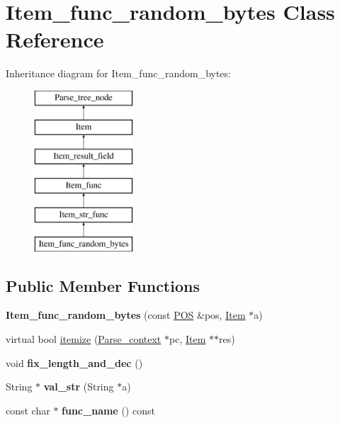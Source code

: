 \hypertarget{classItem__func__random__bytes}{}\section{Item\+\_\+func\+\_\+random\+\_\+bytes Class Reference}
\label{classItem__func__random__bytes}
Inheritance diagram for Item\+\_\+func\+\_\+random\+\_\+bytes\+:\begin{figure}[H]
\begin{center}
\leavevmode
\includegraphics[height=6.000000cm]{classItem__func__random__bytes}
\end{center}
\end{figure}
\subsection*{Public Member Functions}
\begin{DoxyCompactItemize}
\item 
\mbox{\label{classItem__func__random__bytes_adfdfefe08f2b175c391f0cabd0fcadf1}} 
{\bfseries Item\+\_\+func\+\_\+random\+\_\+bytes} (const \mbox{\hyperlink{structYYLTYPE}{P\+OS}} \&pos, \mbox{\hyperlink{classItem}{Item}} $\ast$a)
\item 
virtual bool \mbox{\hyperlink{classItem__func__random__bytes_a77c8913964a4f190b23343325d813d28}{itemize}} (\mbox{\hyperlink{structParse__context}{Parse\+\_\+context}} $\ast$pc, \mbox{\hyperlink{classItem}{Item}} $\ast$$\ast$res)
\item 
\mbox{\label{classItem__func__random__bytes_a60c0a44c5eae249674b5485f9c05b139}} 
void {\bfseries fix\+\_\+length\+\_\+and\+\_\+dec} ()
\item 
\mbox{\label{classItem__func__random__bytes_a2b890441d9ddd67e38033426d3bf4df7}} 
String $\ast$ {\bfseries val\+\_\+str} (String $\ast$a)
\item 
\mbox{\label{classItem__func__random__bytes_a86ebca59beb71ad61ca85684ccd966bb}} 
const char $\ast$ {\bfseries func\+\_\+name} () const
\end{DoxyCompactItemize}
